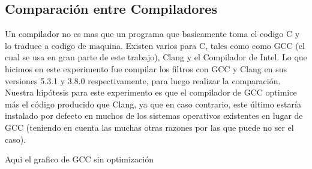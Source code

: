\subsection{Comparación entre Compiladores}
Un compilador no es mas que un programa que basicamente toma el codigo C
y lo traduce a codigo de maquina. Existen varios para C, tales como como GCC (el cual se usa en gran parte de este trabajo), Clang y el Compilador de Intel.
Lo que hicimos en este experimento fue compilar los filtros con GCC y Clang en sus versiones 5.3.1 y 3.8.0 respectivamente, para luego realizar la comparación.
Nuestra hipótesis para este experimento es que el compilador de GCC optimice más el código producido que Clang, ya que en caso contrario, este último estaría instalado por defecto
en muchos de los sistemas operativos existentes en lugar de GCC (teniendo en cuenta las muchas otras razones por las que puede no ser el caso).


Aqui el grafico de GCC sin optimización

\begin{figure}[H]
    \centering
    \begin{floatrow}
    \end{floatrow}
\end{figure}


